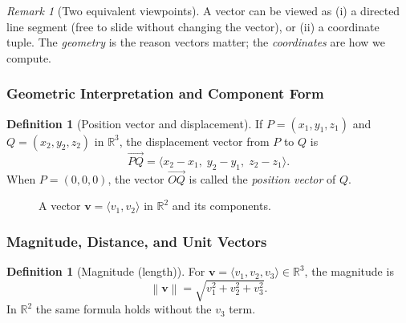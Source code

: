\documentclass[12pt]{article}
\numberwithin{equation}{section}
\newcommand{\RR}{\mathbb{R}}
\newcommand{\vect}[1]{\boldsymbol{#1}}   %
\newcommand{\norm}[1]{\left\lVert #1\right\rVert}
\theoremstyle{plain}
\theoremstyle{definition}
\newtheorem{definition}[theorem]{Definition}
\theoremstyle{remark}
\newtheorem{remark}[theorem]{Remark}
\begin{document}
\begin{remark}[Two equivalent viewpoints]
A vector can be viewed as (i) a directed line segment (free to slide without changing the vector), or (ii) a coordinate tuple.  
The \emph{geometry} is the reason vectors matter; the \emph{coordinates} are how we compute.
\end{remark}

\subsubsection{Geometric Interpretation and Component Form}

\begin{definition}[Position vector and displacement]
If $P=(x_1,y_1,z_1)$ and $Q=(x_2,y_2,z_2)$ in $\RR^3$, the displacement vector from $P$ to $Q$ is
\[
\overrightarrow{PQ}=\langle x_2-x_1,\; y_2-y_1,\; z_2-z_1\rangle.
\]
When $P=(0,0,0)$, the vector $\overrightarrow{OQ}$ is called the \emph{position vector} of $Q$.
\end{definition}

\begin{figure}[H]
\centering
{}
\caption{A vector $\vect{v}=\langle v_1,v_2\rangle$ in $\RR^2$ and its components.}
\label{fig:vec-components}
\end{figure}

\subsubsection{Magnitude, Distance, and Unit Vectors}

\begin{definition}[Magnitude (length)]
For $\vect{v}=\langle v_1,v_2,v_3\rangle \in \RR^3$, the magnitude is
\begin{equation}\label{eq:length}
\norm{\vect{v}}=\sqrt{v_1^2+v_2^2+v_3^2}.
\end{equation}
In $\RR^2$ the same formula holds without the $v_3$ term.
\end{definition}
\end{document}
